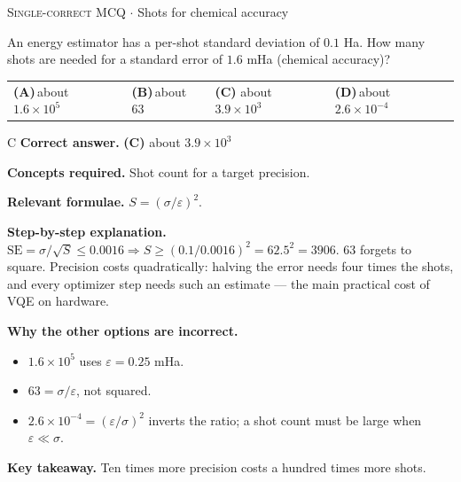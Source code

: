 \documentclass[11pt,a4paper]{article}
\newcommand{\optlabel}[1]{\textbf{(#1)}}
\newcommand{\correctlabel}[1]{\textcolor{okgreen}{\textbf{(#1)}\,\ding{51}}}
\newenvironment{qitem}[1]{\begin{list}{}{\setlength{\leftmargin}{3.3em}\setlength{\labelwidth}{3.1em}%
  \setlength{\labelsep}{0.2em}\setlength{\topsep}{3pt}\setlength{\parsep}{3pt}}\item[\textbf{Q.#1}\hfill]}{\end{list}}
\newcommand{\qsep}{\par\vspace{2pt}{\color{black!15}\hrule}\vspace{4pt}}
\newcommand{\qmeta}[2]{{\footnotesize\color{black!60}\textsc{#1} \;$\cdot$\; #2}\par}
\begin{document}
\begin{qitem}{69}
\qmeta{Single-correct MCQ}{Shots for chemical accuracy}
An energy estimator has a per-shot standard deviation of $0.1$ Ha. How many shots are needed for a standard error of $1.6$ mHa (chemical accuracy)?
\par\smallskip\noindent\begin{tabularx}{\linewidth}{@{}*{4}{L}@{}}
\optlabel{A}\,about $1.6\times10^{5}$ & \optlabel{B}\,about $63$ & \correctlabel{C}\,about $3.9\times10^3$ & \optlabel{D}\,about $2.6\times10^{-4}$
\end{tabularx}
\end{qitem}
\begin{solbox}{C}
\textbf{\color{brand}Correct answer.} \textcolor{okgreen}{\textbf{(C)}} about $3.9\times10^3$

\textbf{\color{brand}Concepts required.} Shot count for a target precision.

\textbf{\color{brand}Relevant formulae.} $S = (\sigma/\varepsilon)^2$.

\textbf{\color{brand}Step-by-step explanation.} $\mathrm{SE} = \sigma/\sqrt S \le 0.0016 \Rightarrow S \ge (0.1/0.0016)^2 = 62.5^2 = 3906$. $63$ forgets to square. Precision costs quadratically: halving
the error needs four times the shots, and every optimizer step needs such an estimate --- the main practical cost of VQE on hardware.

\textbf{\color{brand}Why the other options are incorrect.}
\begin{itemize}[leftmargin=2.4em, itemsep=1pt, topsep=2pt]
\item[\textbf{(A)}] $1.6\times10^5$ uses $\varepsilon = 0.25$ mHa.
\item[\textbf{(B)}] $63 = \sigma/\varepsilon$, not squared.
\item[\textbf{(D)}] $2.6\times10^{-4} = (\varepsilon/\sigma)^2$ inverts the ratio; a shot count must be large when $\varepsilon \ll \sigma$.
\end{itemize}
\textbf{\color{brand}Key takeaway.} Ten times more precision costs a hundred times more shots.
\end{solbox}
\qsep
\end{document}
